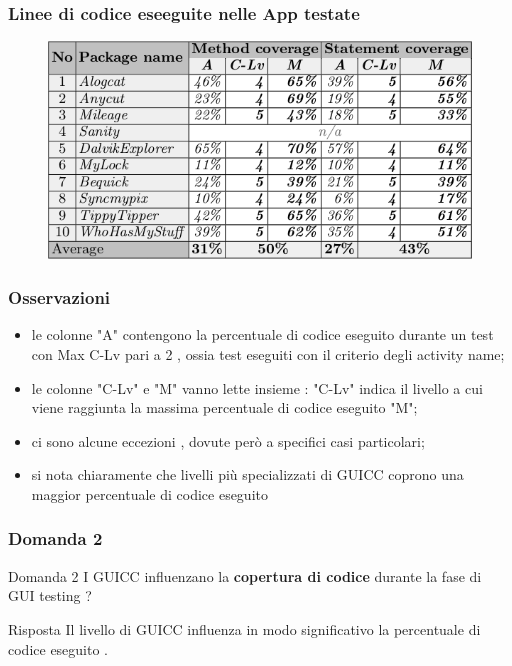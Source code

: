 \documentclass[12pt]{beamer}
\begin{document}
\begin{frame}
\frametitle{Linee di codice eseeguite nelle App testate}
\begin{figure}
\includegraphics[width=0.8\linewidth]{images/LOCcoverage.png}
\end{figure}
\end{frame}


\begin{frame}
\frametitle{Osservazioni}

\begin{itemize}
\item le colonne "A" contengono la percentuale di codice eseguito durante un test con Max C-Lv pari a 2 , ossia test eseguiti con il criterio degli activity name;

\item le colonne "C-Lv" e "M" vanno lette insieme : "C-Lv" indica il livello a cui viene raggiunta la massima percentuale di codice eseguito "M";

\item ci sono alcune eccezioni , dovute per\`o a specifici casi particolari;

\item si nota chiaramente che livelli pi\`u specializzati di GUICC coprono una maggior percentuale di codice eseguito
\end{itemize}


\end{frame}


\begin{frame}
\frametitle{Domanda 2}
\begin{block}{Domanda 2}
    I GUICC influenzano la \textbf{copertura di codice} durante la fase di GUI testing  ? 
\end{block}

\begin{block}{Risposta}
Il livello di GUICC influenza in modo significativo la percentuale di codice eseguito .
\end{block}

\end{frame}
\end{document}
